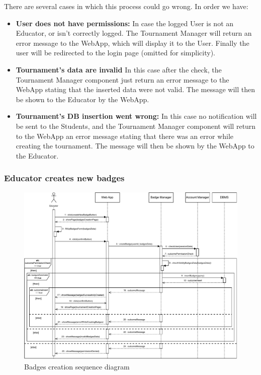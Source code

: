 \documentclass{article}
\begin{document}
{        There are several cases in which this process could go wrong. In order we have:
        \begin{itemize}
            \item \textbf{User does not have permissions:} In case the logged User is not an
            Educator, or isn't correctly logged. The Tournament Manager will return an
            error message to the WebApp, which will display it to the User.
            Finally the user will be redirected to the login page (omitted for simplicity).
            \item \textbf{Tournament's data are invalid} In this case after the check, the 
            Tournament Manager component just return an error message to the WebApp stating 
            that the inserted data were not valid. The message will then be shown to the 
            Educator by the WebApp.
            \item \textbf{Tournament's DB insertion went wrong:} In this case no 
            notification will be sent to the Students, and the Tournament Manager component will 
            return to the WebApp an error message stating that there was an error while 
            creating the tournament.
            The message will then be shown by the WebApp to the Educator.
        \end{itemize}

    \subsubsection{Educator creates new badges}
        \begin{figure}[H]
            \centering
            \hspace*{-1cm}\includegraphics[scale=0.65]{Sequence/Sequence4DD.pdf}
            \caption{Badges creation sequence diagram}
            \label{fig:Sequence4DD}
        \end{figure}

}
\end{document}
